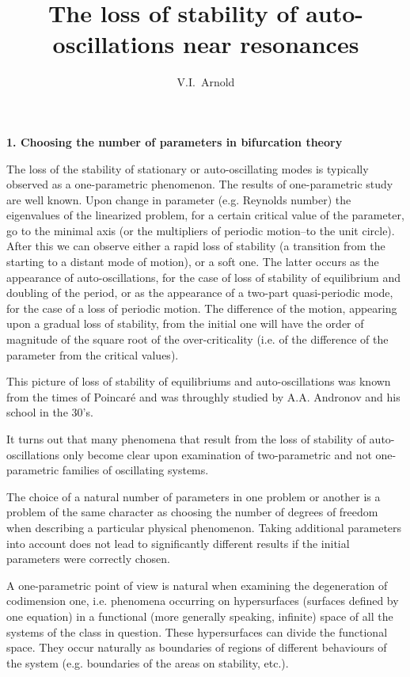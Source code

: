\documentclass[12pt]{amsart}
\title{The loss of stability of auto-oscillations near resonances}
\author{V.I.~Arnold}
\begin{document}
\maketitle
\centerline{\textbf{1. Choosing the number of parameters in bifurcation theory}}
\vspace{1em}
The loss of the stability of stationary or auto-oscillating modes is typically
observed as a one-parametric phenomenon.
The results of one-parametric study are well known.
Upon change in parameter (e.g. Reynolds number) the eigenvalues of the
linearized problem, for a certain critical value of the parameter, go to the
minimal axis (or the multipliers of periodic motion--to the unit circle).
After this we can observe either a rapid loss of stability (a transition from the
starting to a distant mode of motion), or a soft one.
The latter occurs as the appearance of auto-oscillations, for the case of loss
of stability of equilibrium and doubling of the period, or as the appearance of
a two-part quasi-periodic mode, for the case of a loss of periodic motion.
The difference of the motion, appearing upon a gradual loss of stability, from
the initial one will have the order of magnitude of the square root of the
over-criticality (i.e. of the difference of the parameter from the critical
values).

This picture of loss of stability of equilibriums and auto-oscillations was
known from the times of Poincar\'e and was throughly studied by A.A. Andronov
and his school in the 30's.

It turns out that many phenomena that result from the loss of stability of
auto-oscillations only become clear upon examination of two-parametric and not
one-parametric families of oscillating systems.

The choice of a natural number of parameters in one problem or another is a
problem of the same character as choosing the number of degrees of freedom
when describing a particular physical phenomenon.
Taking additional parameters into account does not lead to significantly
different results if the initial parameters were correctly chosen.

A one-parametric point of view is natural when examining the degeneration of
codimension one, i.e. phenomena occurring on hypersurfaces (surfaces defined by
one equation) in a functional (more generally speaking, infinite) space of all
the systems of the class in question.
These hypersurfaces can divide the functional space.
They occur naturally as
boundaries of regions of different behaviours of the system (e.g. boundaries of
the areas on stability, etc.).
\end{document}
